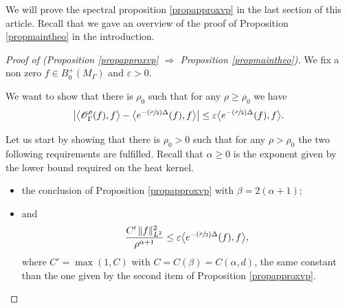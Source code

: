 \documentclass[JEP,XML,SOM,Unicode,NoFloatCountersInSection,published]{cedram}
\let\mathcal\mathscr
\let\epsilon\varepsilon
\newcommand{\Psfrac}[2]{(\sfrac{#1}{#2})}
\theoremstyle{plain}
\theoremstyle{definition}
\begin{document}
We will prove the spectral proposition \ref{propapproxvp} in the last section of this article. Recall that we gave an overview of the proof of Proposition \ref{propmaintheo} in the introduction.

\begin{proof}[Proof of (Proposition \ref{propapproxvp}
$\Rightarrow$ Proposition \ref{propmaintheo})]
We fix a non zero $f \in B^+_0(M_{\Gamma})$ and $\epsilon>0$.

We want to show that there is $\rho_0$ such that for any $\rho \ge \rho_0$ we have
\begin{equation}
\label{equation11}
\bigl| \bigl< \mathcal{O}_{\Gamma}^{\rho}(f), f \bigr> - \bigl< e^{- \Psfrac{\rho}{2} \Delta}(f), f \bigr> \bigr| \le \epsilon \bigl< e^{- \Psfrac{\rho}{2} \Delta}(f), f \bigr>.
\end{equation}

Let us start by showing that there is $\rho_0 > 0$ such that for any $\rho > \rho_0$ the two following requirements are fulfilled. Recall that $\alpha \ge 0$ is the exponent given by the lower bound required on the heat kernel.
\begin{itemize}
\item the conclusion of Proposition \ref{propapproxvp} with $\beta = 2 (\alpha +1)$;
\item and
\[
\frac{ C' \, \|f\|^2_{L^2}}{\rho^{\alpha + 1}} \le \epsilon \bigl< e^{- \Psfrac{\rho }{2} \Delta}(f), f \bigr>,
\]
where $C' = \max(1,C)$ with $C = C(\beta) = C(\alpha, d)$, the same constant than the one given by the second item of Proposition \ref{propapproxvp}.
\end{itemize}


\end{proof}
\end{document}

